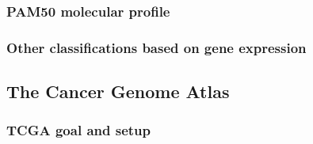  
            
    \subsubsection{PAM50 molecular profile}

    \subsubsection{Other classifications based on gene expression }

        
    \newpage    
    \subsection{The Cancer Genome Atlas}
        \subsubsection{TCGA goal and setup}
